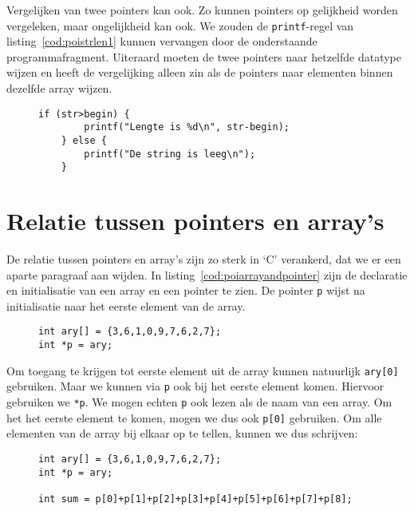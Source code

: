 Vergelijken van twee pointers kan ook. Zo kunnen pointers op gelijkheid worden vergeleken, maar ongelijkheid kan ook. We zouden de \texttt{printf}-regel van listing~\ref{cod:poistrlen1} kunnen vervangen door de onderstaande programmafragment.
Uiteraard moeten de twee pointers naar hetzelfde datatype wijzen en heeft de vergelijking alleen zin als de pointers naar elementen binnen dezelfde array wijzen.

\begin{figure}[!ht]
\begin{lstlisting}[caption=Vergelijken van twee pointers.]
    if (str>begin) {
        printf("Lengte is %d\n", str-begin);
    } else {
        printf("De string is leeg\n");
    }
\end{lstlisting}
\end{figure}


\section{Relatie tussen pointers en array's}
\label{sec:relatietussenpointersenarrays}
De relatie tussen pointers en array's zijn zo sterk in `C' verankerd, dat we er een aparte paragraaf aan wijden. In listing~\ref{cod:poiarrayandpointer} zijn de declaratie en initialisatie van een array en een pointer te zien. De pointer \texttt{p} wijst na initialisatie naar het eerste element van de array.

\begin{figure}[!ht]
\begin{lstlisting}[caption=Declaratie en initialisatie van een array en een pointer.,label=cod:poiarrayandpointer]
int ary[] = {3,6,1,0,9,7,6,2,7};
int *p = ary;
\end{lstlisting}
\end{figure}

Om toegang te krijgen tot eerste element uit de array kunnen natuurlijk \texttt{ary[0]} gebruiken. Maar we kunnen via \texttt{p} ook bij het eerste element komen. Hiervoor gebruiken we \texttt{*p}. We mogen echten \texttt{p} ook lezen als de naam van een array. Om het het eerste element te komen, mogen we dus ook \texttt{p[0]} gebruiken. Om alle elementen van de array bij elkaar op te tellen, kunnen we dus schrijven:

\begin{figure}[!ht]
\begin{lstlisting}[caption=Bepalen sum van elementen in een array.,label=cod:poiarrayandpointersym]
int ary[] = {3,6,1,0,9,7,6,2,7};
int *p = ary;

int sum = p[0]+p[1]+p[2]+p[3]+p[4]+p[5]+p[6]+p[7]+p[8];
\end{lstlisting}
\end{figure}

